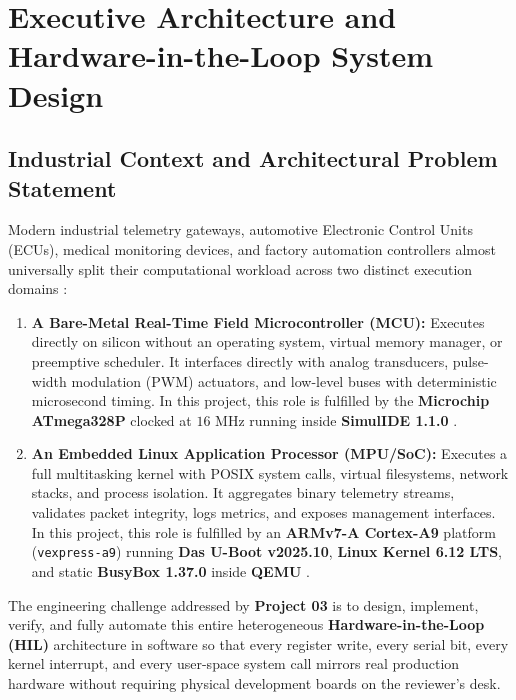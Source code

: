 \documentclass[11pt,a4paper,oneside]{report}
\begin{document}
\tableofcontents
\clearpage
\listoftables
\listoffigures
\lstlistoflistings
\clearpage
{}


\chapter{Executive Architecture and Hardware-in-the-Loop System Design}

\section{Industrial Context and Architectural Problem Statement}

Modern industrial telemetry gateways, automotive Electronic Control Units (ECUs), medical monitoring devices, and factory automation controllers almost universally split their computational workload across two distinct execution domains \cite{simmonds2017,billoo2022}:

\begin{enumerate}
\item \textbf{A Bare-Metal Real-Time Field Microcontroller (MCU):} Executes directly on silicon without an operating system, virtual memory manager, or preemptive scheduler. It interfaces directly with analog transducers, pulse-width modulation (PWM) actuators, and low-level buses with deterministic microsecond timing. In this project, this role is fulfilled by the \textbf{Microchip ATmega328P} clocked at $16\text{ MHz}$ \cite{microchip_328p} running inside \textbf{SimulIDE 1.1.0} \cite{simulide_components}.
\item \textbf{An Embedded Linux Application Processor (MPU/SoC):} Executes a full multitasking kernel with POSIX system calls, virtual filesystems, network stacks, and process isolation. It aggregates binary telemetry streams, validates packet integrity, logs metrics, and exposes management interfaces. In this project, this role is fulfilled by an \textbf{ARMv7-A Cortex-A9} platform (\texttt{vexpress-a9}) running \textbf{Das U-Boot v2025.10}, \textbf{Linux Kernel 6.12 LTS}, and static \textbf{BusyBox 1.37.0} inside \textbf{QEMU} \cite{qemu_vexpress}.
\end{enumerate}

The engineering challenge addressed by \textbf{Project 03} is to design, implement, verify, and fully automate this entire heterogeneous \textbf{Hardware-in-the-Loop (HIL)} architecture in software so that every register write, every serial bit, every kernel interrupt, and every user-space system call mirrors real production hardware without requiring physical development boards on the reviewer's desk.
\end{document}
